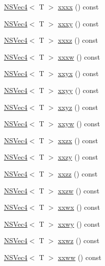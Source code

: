 \begin{DoxyCompactItemize}
\item 
\hyperlink{structNSVec4}{N\-S\-Vec4}$<$ T $>$ \hyperlink{structNSVec4_abb6120fcb30138ac60a3f50abafa6b38}{xxxx} () const 
\item 
\hyperlink{structNSVec4}{N\-S\-Vec4}$<$ T $>$ \hyperlink{structNSVec4_a4d1f9ce6d4e5d7d9d2f31fa0f3ba3426}{xxxy} () const 
\item 
\hyperlink{structNSVec4}{N\-S\-Vec4}$<$ T $>$ \hyperlink{structNSVec4_a0b8d54c15e0345526ea5c150a89c37a1}{xxxz} () const 
\item 
\hyperlink{structNSVec4}{N\-S\-Vec4}$<$ T $>$ \hyperlink{structNSVec4_a38c8c15a48d606dbd73f5f60aad12465}{xxxw} () const 
\item 
\hyperlink{structNSVec4}{N\-S\-Vec4}$<$ T $>$ \hyperlink{structNSVec4_aded683a7368d560f8625cfeeca8cb7ee}{xxyx} () const 
\item 
\hyperlink{structNSVec4}{N\-S\-Vec4}$<$ T $>$ \hyperlink{structNSVec4_a6cc3ed81f165b1f29bd7eebe466775ca}{xxyy} () const 
\item 
\hyperlink{structNSVec4}{N\-S\-Vec4}$<$ T $>$ \hyperlink{structNSVec4_ac51f12399cb69f0bd22cf537ea33162c}{xxyz} () const 
\item 
\hyperlink{structNSVec4}{N\-S\-Vec4}$<$ T $>$ \hyperlink{structNSVec4_a221a3b787aee8a08903c47d3a5dc9a6b}{xxyw} () const 
\item 
\hyperlink{structNSVec4}{N\-S\-Vec4}$<$ T $>$ \hyperlink{structNSVec4_a1ff465b9ace8ca086128f9e61be45c41}{xxzx} () const 
\item 
\hyperlink{structNSVec4}{N\-S\-Vec4}$<$ T $>$ \hyperlink{structNSVec4_a4e4ed95eae57a5cdd7fec5fa01cfc407}{xxzy} () const 
\item 
\hyperlink{structNSVec4}{N\-S\-Vec4}$<$ T $>$ \hyperlink{structNSVec4_a7e9b1c81b2f0f5d3f4d3989be131712b}{xxzz} () const 
\item 
\hyperlink{structNSVec4}{N\-S\-Vec4}$<$ T $>$ \hyperlink{structNSVec4_ab70a5115cc89755dc16444f9fc0e8ae3}{xxzw} () const 
\item 
\hyperlink{structNSVec4}{N\-S\-Vec4}$<$ T $>$ \hyperlink{structNSVec4_a423700e983441987bf0f993840d09575}{xxwx} () const 
\item 
\hyperlink{structNSVec4}{N\-S\-Vec4}$<$ T $>$ \hyperlink{structNSVec4_a98e818ef89c04b1038a7f05eba915d4b}{xxwy} () const 
\item 
\hyperlink{structNSVec4}{N\-S\-Vec4}$<$ T $>$ \hyperlink{structNSVec4_aa63a35cbccb86ca48a799a3b52622765}{xxwz} () const 
\item 
\hyperlink{structNSVec4}{N\-S\-Vec4}$<$ T $>$ \hyperlink{structNSVec4_a21c839a5bf18b7f9158d1609be9ef2c8}{xxww} () const 

\end{DoxyCompactItemize}
